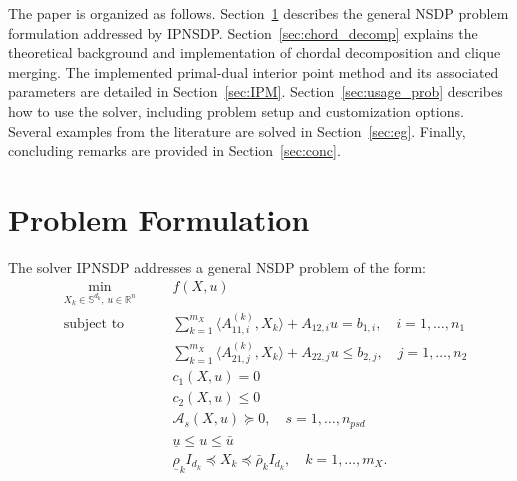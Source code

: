 \documentclass[]{interact}
\theoremstyle{plain}%
\theoremstyle{definition}
\theoremstyle{remark}
\begin{document}
The paper is organized as follows. Section~\ref{sec:prob} describes the general NSDP problem formulation addressed by IPNSDP. Section~\ref{sec:chord_decomp} explains the theoretical background and implementation of chordal decomposition and clique merging. The implemented primal-dual interior point method and its associated parameters are detailed in Section~\ref{sec:IPM}. Section~\ref{sec:usage_prob} describes how to use the solver, including problem setup and customization options. Several examples from the literature are solved in Section~\ref{sec:eg}. Finally, concluding remarks are provided in Section~\ref{sec:conc}.


\section{Problem Formulation}\label{sec:prob}
The solver IPNSDP addresses a general NSDP problem of the form:
\begin{equation}\label{eq:genform_explicit}
\begin{aligned}
& \min_{X_k \in \mathbb{S}^{d_k},\, u \in \mathbb{R}^n} \quad && f(X,u) \\
& \text{subject to}
& & \sum_{k=1}^{m_X} \langle A_{11,i}^{(k)}, X_k \rangle + A_{12,i} u = b_{1,i}, \quad i=1,\dots,n_1 \\
& & & \sum_{k=1}^{m_X} \langle A_{21,j}^{(k)}, X_k \rangle + A_{22,j} u \leq b_{2,j}, \quad j=1,\dots,n_2 \\
& & & c_1(X,u) = 0 \\
& & & c_2(X,u) \leq 0 \\
& & & \mathcal{A}_s(X,u) \succeq 0, \quad s=1,\dots,n_{psd} \\
& & & \underline{u} \leq u \leq \bar{u} \\
& & & \underline{\rho}_k I_{d_k} \preceq X_k \preceq \bar{\rho}_k I_{d_k}, \quad k=1,\dots,m_X.
\end{aligned}
\end{equation}
\end{document}
